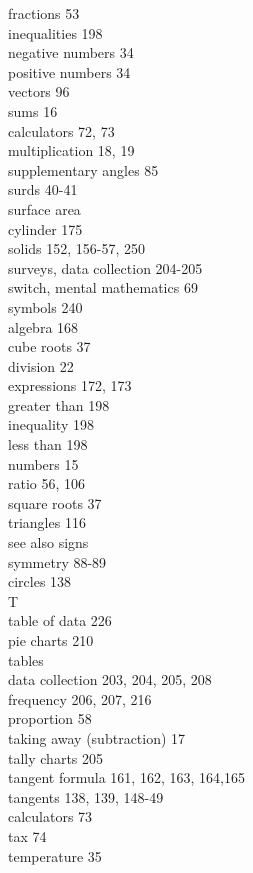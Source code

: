 \documentclass[10pt]{article}
\begin{document}
fractions 53\\
inequalities 198\\
negative numbers 34\\
positive numbers 34\\
vectors 96\\
sums 16\\
calculators 72, 73\\
multiplication 18, 19\\
supplementary angles 85\\
surds 40-41\\
surface area\\
cylinder 175\\
solids 152, 156-57, 250\\
surveys, data collection 204-205\\
switch, mental mathematics 69\\
symbols 240\\
algebra 168\\
cube roots 37\\
division 22\\
expressions 172, 173\\
greater than 198\\
inequality 198\\
less than 198\\
numbers 15\\
ratio 56, 106\\
square roots 37\\
triangles 116\\
see also signs\\
symmetry 88-89\\
circles 138\\
T\\
table of data 226\\
pie charts 210\\
tables\\
data collection 203, 204, 205, 208\\
frequency 206, 207, 216\\
proportion 58\\
taking away (subtraction) 17\\
tally charts 205\\
tangent formula 161, 162, 163, 164,165\\
tangents 138, 139, 148-49\\
calculators 73\\
tax 74\\
temperature 35\\
\end{document}

